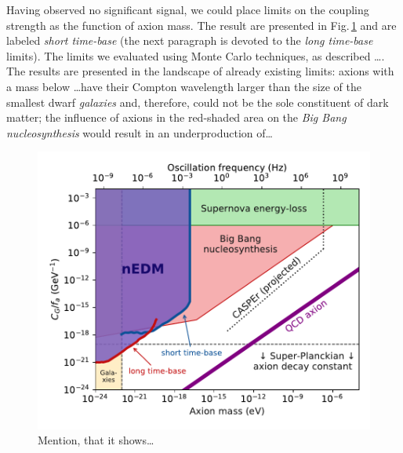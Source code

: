 Having observed no significant signal, we could place limits on the coupling strength as the function of axion mass.
The result are presented in Fig.\,\ref{fig:axions_limits_coupling} and are labeled \emph{short time-base} (the next paragraph is devoted to the \emph{long time-base} limits).
The limits we evaluated using Monte Carlo techniques, as described \ldots.
The results are presented in the landscape of already existing limits: axions with a mass below \ldots have their Compton wavelength larger than the size of the smallest dwarf \emph{galaxies} and, therefore, could not be the sole constituent of dark matter; the influence of axions in the red-shaded area on the \emph{Big Bang nucleosynthesis} would result in an underproduction of\ldots
{}

\begin{figure}
  \centering
  \includegraphics[width=0.9\linewidth]{gfx/axions/psi_ill_axion_limits_v7.pdf}
  \caption{Mention, that it shows\ldots}
  \label{fig:axions_limits_coupling}
\end{figure}

